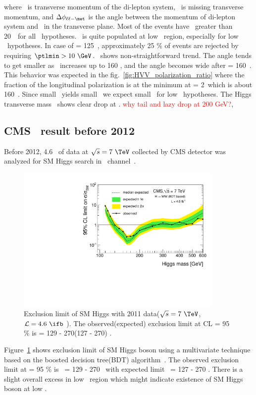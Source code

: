 where \ptll\ is transverse momentum of the di-lepton system, 
\met\ is missing transverse momentum, and  
$\Delta\phi_{\ell\ell-\met}$ is the angle between the momentum of di-lepton
system and \met\ in the transverse plane.
Most of the events have \ptlmax\ greater than 20~\GeV\ for all \mHi\ hypotheses. 
\ptlmin\ is quite populated at low \ptlmin\ region, especially for low \mHi\ 
hypotheses. In case of \mHi = 125~\GeV, approximately 25 \% of 
events are rejected by requiring $\ptlmin>10~\GeV$. 
\delphill\ shows non-straightforward trend. The angle tends to get smaller 
as \mHi\ increases up to 160 \GeV, and the angle becomes wide 
after \mHi = 160~\GeV. This behavior was expected in the 
fig.~\ref{fig:HVV_polarization_ratio} where the fraction of the 
longitudinal polarization is at the minimum at \mHi = 2\mW\ which is about 160~\GeV. 
Since small \delphill\ yields small \mll\, we expect small \mll\ 
for low \mHi\ hypotheses. The Higgs transverse mass \mT\ shows clear 
drop at \mHi. \textcolor{red}{why tail and lazy drop at 200 GeV?}, 

%
\subsection{CMS \hww\ result before 2012}

Before 2012, 4.6 \ifb\ of data at $\sqrt{s}=7~\TeV$ collected by CMS detector 
was analyzed for SM Higgs search in \hww\ channel~\cite{Chatrchyan201291}. 
\begin{figure}
\centering
\includegraphics[width=0.9\textwidth]{figures/limits_nj_shape.pdf}
\caption{ Exclusion limit of SM Higgs with 2011 data($\sqrt{s}=7~\TeV$, $\mathcal{L}=4.6~\ifb$ ).
The observed(expected) exclusion limit at CL  = 95 \% is \mHi = 129 - 270(127 - 270) \GeV.}
\label{fig:hww2011}
\end{figure}
Figure~\ref{fig:hww2011} shows exclusion limit of SM Higgs boson 
using a multivariate technique based on the boosted decision tree(BDT) algorithm~\cite{}.
The observed exclusion limit at \CLs  = 95 \% is \mHi\ = 129 - 270 \GeV\
with expected limit \mHi\ = 127 - 270 \GeV. There is a slight overall excess 
in low \mHi\ region which might indicate existence of SM Higgs boson at low \mHi.  

